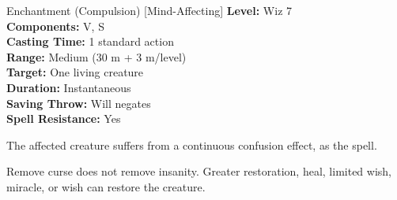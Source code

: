 {Enchantment (Compulsion) [Mind-Affecting]}
{
	\textbf{Level:}
	Wiz 7\\
	\textbf{Components:}
	V, S\\
	\textbf{Casting Time:}
	1 standard action\\
	\textbf{Range:}
	Medium (30 m + 3 m/level)\\
	\textbf{Target:}
	One living creature\\
	\textbf{Duration:}
	Instantaneous\\
	\textbf{Saving Throw:}
	Will negates\\
	\textbf{Spell Resistance:}
	Yes\\
}
{
	The affected creature suffers from a continuous confusion effect, as the spell.

Remove curse does not remove insanity. Greater restoration, heal, limited wish, miracle, or wish can restore the creature.

}
